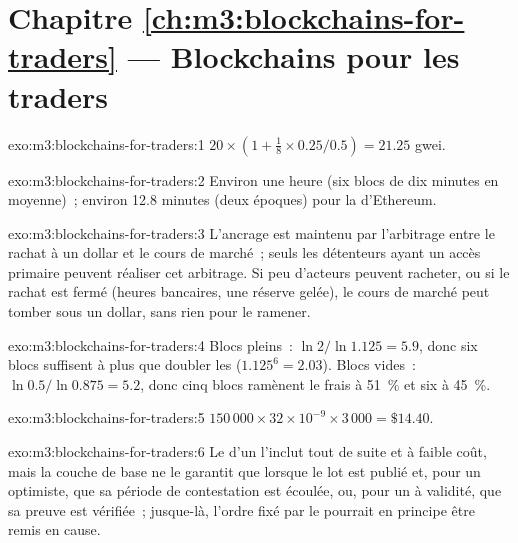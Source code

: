 \section*{Chapitre \ref{ch:m3:blockchains-for-traders} --- Blockchains pour les traders}

\begin{solution}{exo:m3:blockchains-for-traders:1}
$20 \times (1 + \tfrac18 \times 0.25/0.5) = 21.25$ gwei.
\end{solution}

\begin{solution}{exo:m3:blockchains-for-traders:2}
Environ une heure (six blocs de dix minutes en moyenne)~; environ 12.8 minutes (deux époques) pour la  d'Ethereum.
\end{solution}

\begin{solution}{exo:m3:blockchains-for-traders:3}
L'ancrage est maintenu par l'arbitrage entre le rachat à un dollar et le cours de marché~; seuls les détenteurs
ayant un accès primaire peuvent réaliser cet arbitrage. Si peu d'acteurs peuvent racheter, ou si le rachat est fermé
(heures bancaires, une réserve gelée), le cours de marché peut tomber sous un dollar, sans rien pour le ramener.
\end{solution}

\begin{solution}{exo:m3:blockchains-for-traders:4}
Blocs pleins~: $\ln 2/\ln 1.125 = 5.9$, donc six blocs suffisent à plus que doubler les  ($1.125^6 = 2.03$). Blocs vides~:
$\ln 0.5/\ln 0.875 = 5.2$, donc cinq blocs ramènent le frais à 51~\% et six à 45~\%.
\end{solution}

\begin{solution}{exo:m3:blockchains-for-traders:5}
$150\,000 \times 32 \times 10^{-9} \times 3\,000 = \$14.40$.
\end{solution}

\begin{solution}{exo:m3:blockchains-for-traders:6}
Le  d'un  l'inclut tout de suite et à faible coût, mais la couche de base ne le garantit que lorsque le lot
est publié et, pour un  optimiste, que sa période de contestation est écoulée, ou, pour un  à validité, que sa preuve
est vérifiée~; jusque-là, l'ordre fixé par le  pourrait en principe être remis en cause.
\end{solution}

